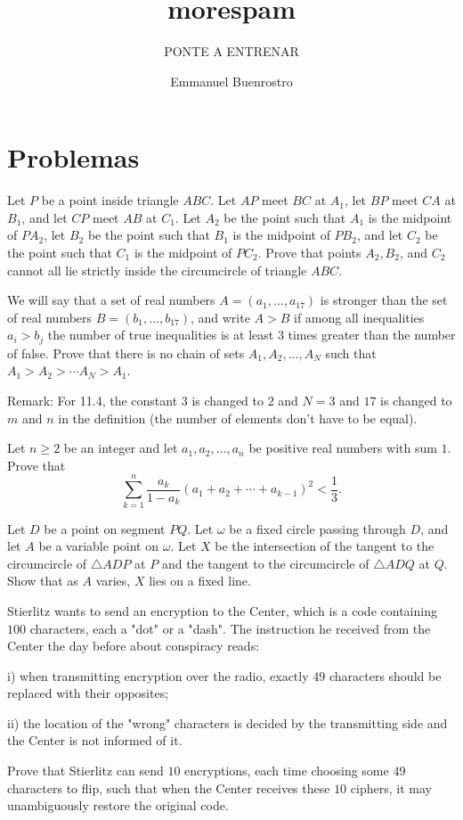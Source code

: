 \documentclass[11pt]{scrartcl}
\title{morespam}
\subtitle{PONTE A ENTRENAR}
\author{Emmanuel Buenrostro}
\begin{document}
\maketitle

\section{Problemas}
\begin{problem}[3245291910836201005]
	Let $P$ be a point inside triangle $ABC$. Let $AP$ meet $BC$ at $A_1$, let $BP$ meet $CA$ at $B_1$, and let $CP$ meet $AB$ at $C_1$. Let $A_2$ be the point such that $A_1$ is the midpoint of $PA_2$, let $B_2$ be the point such that $B_1$ is the midpoint of $PB_2$, and let $C_2$ be the point such that $C_1$ is the midpoint of $PC_2$. Prove that points $A_2, B_2$, and $C_2$ cannot all lie strictly inside the circumcircle of triangle $ABC$.
\end{problem}
\begin{problem}[35724831608408]
	We will say that a set of real numbers $A = (a_1,... , a_{17})$ is stronger than the set of real numbers $B = (b_1, . . . , b_{17})$, and write $A >B$ if among all inequalities $a_i > b_j$ the number of true inequalities is at least $3$ times greater than the number of false. Prove that there is no chain of sets $A_1, A_2, .  .  .  , A_N$ such that $A_1>A_2> \cdots A_N>A_1$.

Remark: For 11.4, the constant $3$ is changed to $2$ and $N=3$ and $17$ is changed to $m$ and $n$ in the definition (the number of elements don't have to be equal).
\end{problem}
\begin{problem}[723258861624579]
Let $n\geq 2$ be an integer and let $a_1, a_2, \ldots, a_n$ be positive real numbers with sum $1$. Prove that$$\sum_{k=1}^n \frac{a_k}{1-a_k}(a_1+a_2+\cdots+a_{k-1})^2 < \frac{1}{3}.$$
\end{problem}
\begin{problem}[8152181601565653036]
Let \(D\) be a point on segment \(PQ\). Let \(\omega\) be a fixed circle passing through \(D\), and let \(A\) be a variable point on \(\omega\). Let \(X\) be the intersection of the tangent to the circumcircle of \(\triangle ADP\) at \(P\) and the tangent to the circumcircle of \(\triangle ADQ\) at \(Q\). Show that as \(A\) varies, \(X\) lies on a fixed line.
\end{problem}
\begin{problem}[966139221944695]
Stierlitz wants to send an encryption to the Center, which is a code containing $100$ characters, each a "dot" or a "dash". The instruction he received from the Center the day before about conspiracy reads:

i) when transmitting encryption over the radio, exactly $49$ characters should be replaced with their opposites;

ii) the location of the "wrong" characters is decided by the transmitting side and the Center is not informed of it.

Prove that Stierlitz can send $10$ encryptions, each time choosing some $49$ characters to flip, such that when the Center receives these $10$ ciphers, it may unambiguously restore the original code.
\end{problem}
\end{document}
